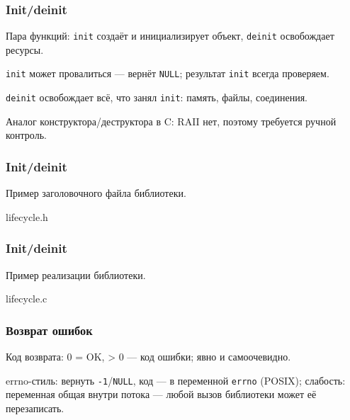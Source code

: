 \documentclass[compress, 8pt, aspectratio=169]{beamer}
\begin{document}
\begin{frame}[fragile]

    \frametitle{Init/deinit}

    \begin{myitemize}

        \item Пара функций: \texttt{init} создаёт и
            инициализирует объект, \texttt{deinit} освобождает
            ресурсы.

        \item \texttt{init} может провалиться --- вернёт
            \texttt{NULL}; результат \texttt{init}
            всегда проверяем.

        \item \texttt{deinit} освобождает всё, что занял
            \texttt{init}: память, файлы, соединения.

        \item Аналог конструктора/деструктора в C: RAII нет,
            поэтому требуется ручной контроль.

    \end{myitemize}

\end{frame}

\begin{frame}[fragile]

    \frametitle{Init/deinit}

    Пример заголовочного файла библиотеки.

    \bigbreak

        {lifecycle.h}

\end{frame}

\begin{frame}[fragile]

    \frametitle{Init/deinit}

    Пример реализации библиотеки.

    \bigbreak

        {lifecycle.c}

\end{frame}

\begin{frame}[fragile]

    \frametitle{Возврат ошибок}

    \begin{myitemize}

        \item Код возврата: 0 = OK, > 0 --- код ошибки;
            явно и самоочевидно.

        \item errno-стиль: вернуть \texttt{-1}/\texttt{NULL},
            код --- в переменной \texttt{errno} (POSIX);
            слабость: переменная общая внутри потока ---
            любой вызов библиотеки может её перезаписать.

    \end{myitemize}

\end{frame}
\end{document}
